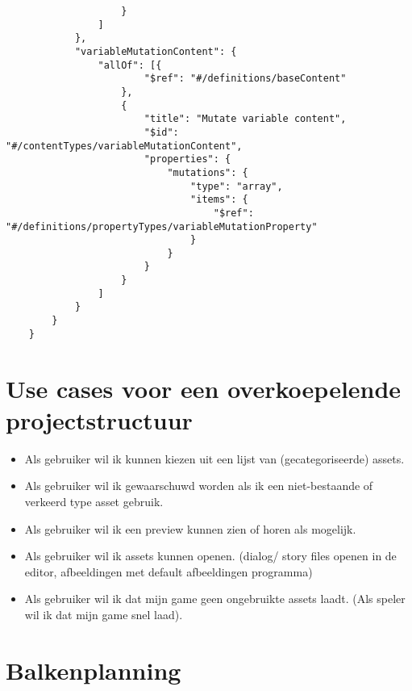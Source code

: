 \begin{appendices}
\begin{lstlisting}
                    }
                ]
            },
            "variableMutationContent": {
                "allOf": [{
                        "$ref": "#/definitions/baseContent"
                    },
                    {
                        "title": "Mutate variable content",
                        "$id": "#/contentTypes/variableMutationContent",
                        "properties": {
                            "mutations": {
                                "type": "array",
                                "items": {
                                    "$ref": "#/definitions/propertyTypes/variableMutationProperty"
                                }
                            }
                        }
                    }
                ]
            }
        }
    }
    \end{lstlisting}
    
    \chapter{Use cases voor een overkoepelende projectstructuur}
    \label{app:usecasesprojectstructuur}
    \begin{itemize}
        \item Als gebruiker wil ik kunnen kiezen uit een lijst van (gecategoriseerde) assets.
        \item Als gebruiker wil ik gewaarschuwd worden als ik een niet-bestaande of verkeerd type asset gebruik.
        \item Als gebruiker wil ik een preview kunnen zien of horen als mogelijk.
        \item Als gebruiker wil ik assets kunnen openen. (dialog/ story files openen in de editor, afbeeldingen met default afbeeldingen programma)
        \item Als gebruiker wil ik dat mijn game geen ongebruikte assets laadt. (Als speler wil ik dat mijn game snel laad).
    \end{itemize}

    \chapter{Balkenplanning}
    \label{app:ganttchart}


\end{appendices}
